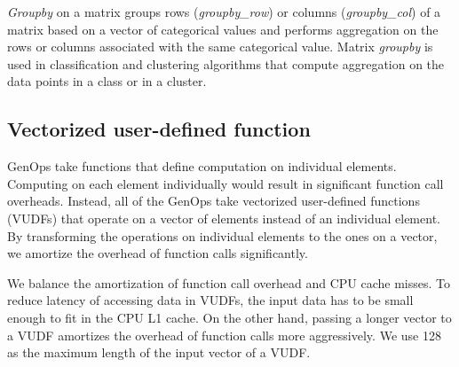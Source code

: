 \textit{Groupby} on a matrix groups rows (\textit{groupby\_row}) or columns
(\textit{groupby\_col}) of a matrix based on a vector of categorical values
and performs aggregation on the rows or
columns associated with the same categorical value. Matrix \textit{groupby}
is used in classification and clustering algorithms that compute
aggregation on the data points in a class or in a cluster.

\subsection{Vectorized user-defined function} \label{sec:vudf}
GenOps take functions that define computation on individual elements.
Computing on each element individually would
result in significant function call overheads. Instead, all of
the GenOps take vectorized user-defined functions (VUDFs) that operate on
a vector of elements instead of an individual element. By transforming
the operations on individual elements to the ones on a vector, we amortize
the overhead of function calls significantly.

We balance the amortization of function call overhead and CPU cache misses.
To reduce latency of accessing data in VUDFs,
the input data has to be small enough to fit in the CPU L1 cache. On the
other hand, passing a longer vector to a VUDF amortizes the overhead of
function calls more aggressively. We use 128 as the maximum length of
the input vector of a VUDF. %

